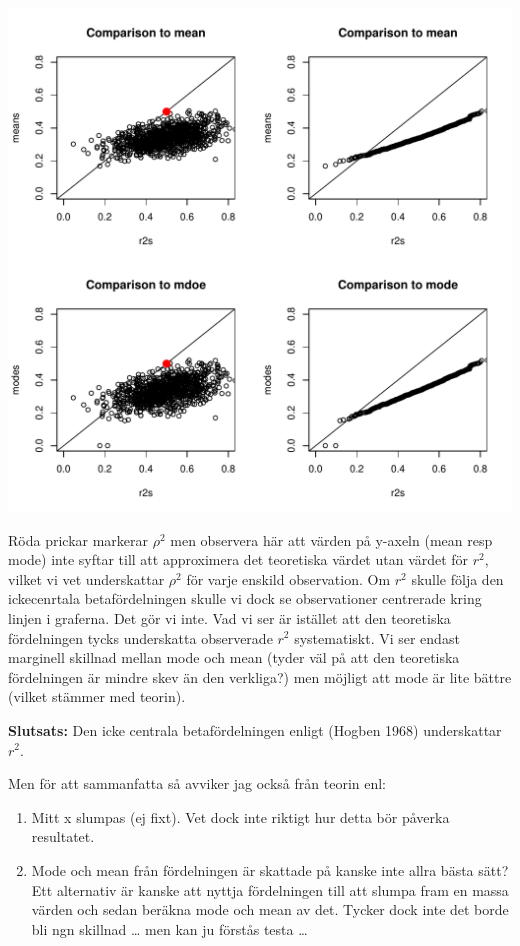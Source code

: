 \documentclass[]{article}
\providecommand{\tightlist}{%
  \setlength{\itemsep}{0pt}\setlength{\parskip}{0pt}}
\begin{document}
\includegraphics{2016_w09_files/figure-latex/unnamed-chunk-6-1.pdf}

Röda prickar markerar \(\rho^2\) men observera här att värden på y-axeln
(mean resp mode) inte syftar till att approximera det teoretiska värdet
utan värdet för \(r^2\), vilket vi vet underskattar \(\rho^2\) för varje
enskild observation. Om \(r^2\) skulle följa den ickecenrtala
betafördelningen skulle vi dock se observationer centrerade kring linjen
i graferna. Det gör vi inte. Vad vi ser är istället att den teoretiska
fördelningen tycks underskatta observerade \(r^2\) systematiskt. Vi ser
endast marginell skillnad mellan mode och mean (tyder väl på att den
teoretiska fördelningen är mindre skev än den verkliga?) men möjligt att
mode är lite bättre (vilket stämmer med teorin).

\textbf{Slutsats:} Den icke centrala betafördelningen enligt (Hogben
1968) underskattar \(r^2\).

Men för att sammanfatta så avviker jag också från teorin enl:

\begin{enumerate}
\def\labelenumi{\arabic{enumi}.}
\tightlist
\item
  Mitt x slumpas (ej fixt). Vet dock inte riktigt hur detta bör påverka
  resultatet.
\item
  Mode och mean från fördelningen är skattade på kanske inte allra bästa
  sätt? Ett alternativ är kanske att nyttja fördelningen till att slumpa
  fram en massa värden och sedan beräkna mode och mean av det. Tycker
  dock inte det borde bli ngn skillnad \ldots{} men kan ju förstås testa
  \ldots{}
\end{enumerate}
\end{document}
